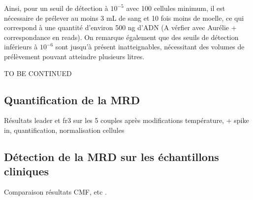 Ainsi, pour un seuil de détection à $10^{-5}$ avec 100 cellules minimum, il est nécessaire de prélever au moins 3 mL de sang 
et 10 fois moins de moelle, ce qui correspond à une quantité d'environ 500 ng d'ADN (A vérfier avec Aurélie + correspondance en reads). On remarque également 
que des seuils de détection inférieurs à $10^{-6}$ sont jusqu'à présent inatteignables, nécessitant des volumes de prélèvement pouvant 
atteindre plusieurs litres.

TO BE CONTINUED

\subsection{Quantification de la MRD}

Résultats leader et fr3 sur les 5 couples après modifications température, + spike in, quantification, normalisation cellules 

\subsection{Détection de la MRD sur les échantillons cliniques}

Comparaison résultats CMF, etc .